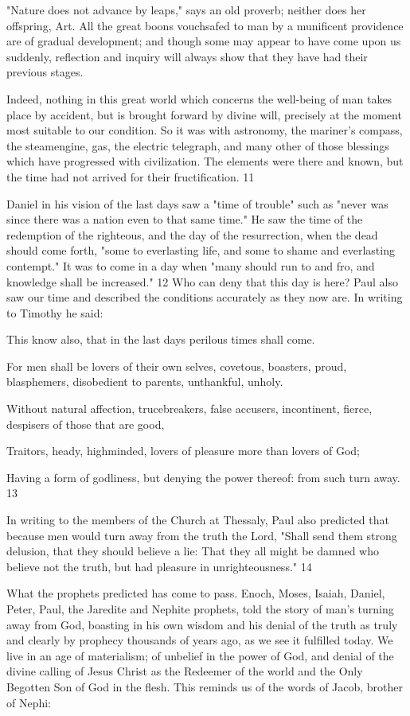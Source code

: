 "Nature does not advance by leaps," says an old proverb; neither does her offspring, Art. All
the great boons vouchsafed to man by a munificent providence are of gradual development;
and though some may appear to have come upon us suddenly, reflection and inquiry will
always show that they have had their previous stages.

Indeed, nothing in this great world which concerns the well-being of man takes place by
accident, but is brought forward by divine will, precisely at the moment most suitable to our
condition. So it was with astronomy, the mariner's compass, the steamengine, gas, the
electric telegraph, and many other of those blessings which have progressed with civilization.
The elements were there and known, but the time had not arrived for their fructification. 11

Daniel in his vision of the last days saw a "time of trouble" such as "never was since there
was a nation even to that same time." He saw the time of the redemption of the righteous, and
the day of the resurrection, when the dead should come forth, "some to everlasting life, and
some to shame and everlasting contempt." It was to come in a day when "many should run to
and fro, and knowledge shall be increased." 12 Who can deny that this day is here? Paul also
saw our time and described the conditions accurately as they now are. In writing to Timothy
he said:

This know also, that in the last days perilous times shall come.

For men shall be lovers of their own selves, covetous, boasters, proud, blasphemers,
disobedient to parents, unthankful, unholy.

Without natural affection, trucebreakers, false accusers, incontinent, fierce, despisers of those
that are good,

Traitors, heady, highminded, lovers of pleasure more than lovers of God;

Having a form of godliness, but denying the power thereof: from such turn away. 13

In writing to the members of the Church at Thessaly, Paul also predicted that because men
would turn away from the truth the Lord, "Shall send them strong delusion, that they should
believe a lie: That they all might be damned who believe not the truth, but had pleasure in
unrighteousness." 14

What the prophets predicted has come to pass. Enoch, Moses, Isaiah, Daniel, Peter, Paul, the
Jaredite and Nephite prophets, told the story of man's turning away from God, boasting in his
own wisdom and his denial of the truth as truly and clearly by prophecy thousands of years
ago, as we see it fulfilled today. We live in an age of materialism; of unbelief in the power of
God, and denial of the divine calling of Jesus Christ as the Redeemer of the world and the
Only Begotten Son of God in the flesh. This reminds us of the words of Jacob, brother of
Nephi:

